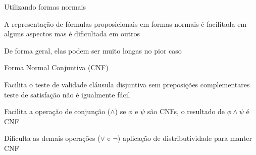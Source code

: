 \expandafter\documentclass\expandafter[table, usenames, svgnames, dvipsnames,14pt, \classopts]{beamer}
\begin{document}
\begin{frame}{Utilizando formas normais}

    \begin{outline}
        \1 A representação de fórmulas proposicionais em formas normais é facilitada em alguns aspectos
            \2[-] mas é dificultada em outros
        
        \vspace{1em}
        
        \1 De forma geral, elas podem ser muito longas no pior caso
    \end{outline}
\end{frame}

\begin{frame}{Forma Normal Conjuntiva (\uppercase{CNF})}

    \begin{outline}
        \1 Facilita o teste de validade
            \2[-] cláusula disjuntiva sem preposições complementares
            \2[-] teste de satisfação não é igualmente fácil
        
        \vspace{1em}
        
        \1 Facilita a operação de conjunção ($\land$)
            \2[-] se $\phi$ e $\psi$ são CNFs, o resultado de $\phi \land \psi$ é CNF
        
        \vspace{1em}
        
        \1 Dificulta as demais operações ($\lor$ e $\lnot$)
            \2[-] aplicação de distributividade para manter CNF
    \end{outline}

    \begin{center}
    \end{center}
    
\end{frame}
\end{document}
